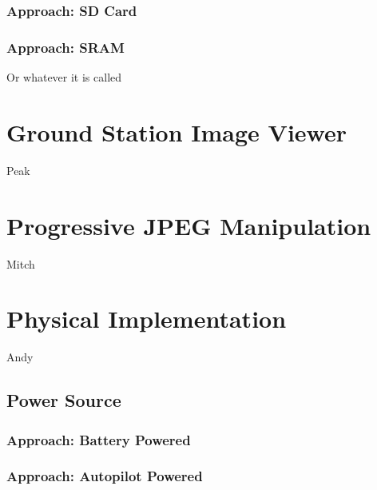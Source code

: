 \subsubsection{Approach: SD Card}

\subsubsection{Approach: SRAM}
Or whatever it is called





\section{Ground Station Image Viewer}
Peak

\section{Progressive JPEG Manipulation}
Mitch

\section{Physical Implementation}
Andy
	
\subsection{Power Source}

\subsubsection{Approach: Battery Powered}

\subsubsection{Approach: Autopilot Powered}

